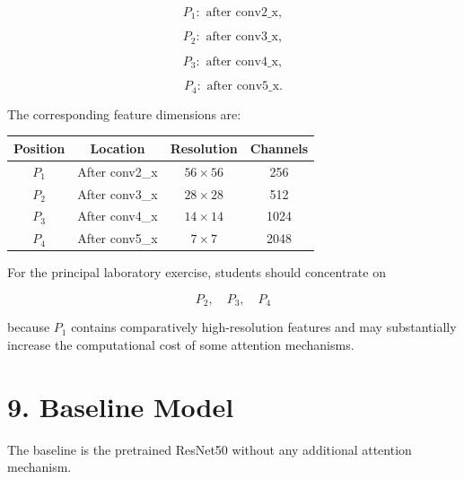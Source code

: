 \documentclass[10pt]{article}
\begin{document}
\[
P_1:
\text{ after conv2\_x},
\]

\[
P_2:
\text{ after conv3\_x},
\]

\[
P_3:
\text{ after conv4\_x},
\]

\[
P_4:
\text{ after conv5\_x}.
\]

The corresponding feature dimensions are:

\begin{center}

\begin{tabular}{|c|c|c|c|}
\hline

\textbf{Position}
&
\textbf{Location}
&
\textbf{Resolution}
&
\textbf{Channels}
\\
\hline

$P_1$
&
After conv2\_x
&
$56\times56$
&
256
\\
\hline

$P_2$
&
After conv3\_x
&
$28\times28$
&
512
\\
\hline

$P_3$
&
After conv4\_x
&
$14\times14$
&
1024
\\
\hline

$P_4$
&
After conv5\_x
&
$7\times7$
&
2048
\\
\hline

\end{tabular}

\end{center}

For the principal laboratory exercise, students should concentrate on

\[
\boxed{
P_2,\quad P_3,\quad P_4
}
\]

because $P_1$ contains comparatively high-resolution features and may
substantially increase the computational cost of some attention mechanisms.

\section*{9. Baseline Model}

The baseline is the pretrained ResNet50 without any additional attention
mechanism.
\end{document}
